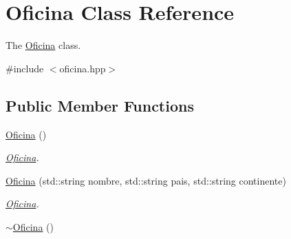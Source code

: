 \hypertarget{classOficina}{}\section{Oficina Class Reference}
\label{classOficina}


The \hyperlink{classOficina}{Oficina} class.  




{\ttfamily \#include $<$oficina.\+hpp$>$}

\subsection*{Public Member Functions}
\begin{DoxyCompactItemize}
\item 
\hyperlink{classOficina_adfc639739930fedda32e7790583f2342}{Oficina} ()
\begin{DoxyCompactList}\small\item\em \hyperlink{classOficina}{Oficina}. \end{DoxyCompactList}\item 
\hyperlink{classOficina_a98663f13af9d8679a234e3c68c4ceb36}{Oficina} (std\+::string nombre, std\+::string pais, std\+::string continente)
\begin{DoxyCompactList}\small\item\em \hyperlink{classOficina}{Oficina}. \end{DoxyCompactList}\item 
\hypertarget{classOficina_a34125758ffc92b87f19e21d24cb92c60}{}\hyperlink{classOficina_a34125758ffc92b87f19e21d24cb92c60}{$\sim$\+Oficina} ()\label{classOficina_a34125758ffc92b87f19e21d24cb92c60}


\end{DoxyCompactItemize}
